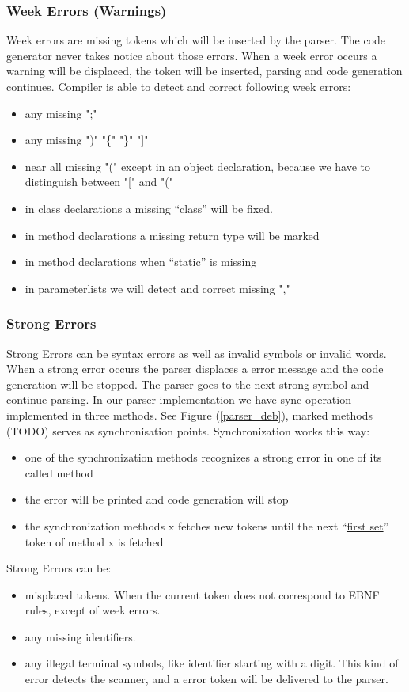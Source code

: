 \subsubsection{Week Errors (Warnings)}
\label{label_week_errors}
Week errors are missing tokens which will be inserted by the parser.
The code generator never takes notice about those errors. When a week error occurs a warning will be displaced, the token will be inserted, parsing and code generation continues.
Compiler is able to detect and correct following week errors:
\begin{itemize}
  \item any missing ";"
  \item any missing ")" "\{" "\}" "]" 
  \item near all missing "(" except in an object declaration, because we have to distinguish between "[" and "(" 
  \item in class declarations a missing ``class'' will be fixed.
  \item in method declarations a missing return type will be marked
  \item in method declarations when ``static'' is missing
  \item in parameterlists we will detect and correct missing ","
\end{itemize}

\subsubsection{Strong Errors}
\label{label_strong_errors}
Strong Errors can be syntax errors as well as invalid symbols or invalid words. When a strong error occurs the parser displaces a error
message and the code generation will be stopped. The parser goes to the next strong symbol and continue parsing. In our parser
implementation we have sync operation implemented in three methods. See Figure (\ref{parser_deb}), marked methods (TODO) serves as
synchronisation points. Synchronization works this way:
\begin{itemize}
  \item one of the synchronization methods recognizes a strong error in one of its called method
  \item the error will be printed and code generation will stop
  \item the synchronization methods x fetches new tokens until the next ``\hyperref[first_sets]{first set}'' token of method x is fetched
\end{itemize}
Strong Errors can be:
\begin{itemize}
  \item misplaced tokens. When the current token does not correspond to EBNF rules, except of week errors.
  \item any missing identifiers.
  \item any illegal terminal symbols, like identifier starting with a digit. This kind of error detects the scanner, and a
  error token will be delivered to the parser.
\end{itemize}

